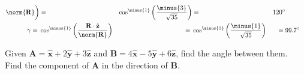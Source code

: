 \begin{solution}
\begin{subequations}
\begin{align}
                            {\norm{\mathbf{R}}}
                        \bigg)
                        &=\;&\cos^{\minus{1}}
                            \bigg(\frac{\minus{3}}{\sqrt{35}}\bigg)
                        &=\;&120^{\circ}\\
                        \gamma=\;&\cos^{\minus{1}}\bigg(
                            \frac{\mathbf{R}\cdot\hat{\mathbf{z}}}
                            {\norm{\mathbf{R}}}
                        \bigg)
                        &=\;&\cos^{\minus{1}}
                            \bigg(\frac{\minus{1}}{\sqrt{35}}\bigg)
                        &=\;&99.7^{\circ}
                    \end{align}
                \end{subequations}
            \end{solution}
            \begin{problem}
                Given
                $\mathbf{A}=\hat{\mathbf{x}}%
                           +2\hat{\mathbf{y}}%
                           +3\hat{\mathbf{z}}$
                and
                $\mathbf{B}=4\hat{\mathbf{x}}%
                           -5\hat{\mathbf{y}}%
                           +6\hat{\mathbf{z}}$,
                find the angle between them. Find the component of
                $\mathbf{A}$ in the direction of $\mathbf{B}$.
            \end{problem}
